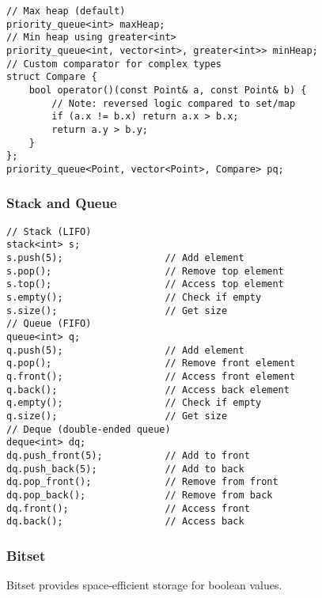 \documentclass[11pt,a4paper]{article}
\begin{document}
\begin{lstlisting}[caption={Basic Priority Queue}]
// Max heap (default)
priority_queue<int> maxHeap;
// Min heap using greater<int>
priority_queue<int, vector<int>, greater<int>> minHeap;
// Custom comparator for complex types
struct Compare {
    bool operator()(const Point& a, const Point& b) {
        // Note: reversed logic compared to set/map
        if (a.x != b.x) return a.x > b.x;
        return a.y > b.y;
    }
};
priority_queue<Point, vector<Point>, Compare> pq;
\end{lstlisting}



\subsubsection{Stack and Queue}
\begin{lstlisting}[caption={Stack and Queue Operations}]
// Stack (LIFO)
stack<int> s;
s.push(5);                  // Add element
s.pop();                    // Remove top element
s.top();                    // Access top element
s.empty();                  // Check if empty
s.size();                   // Get size
// Queue (FIFO)
queue<int> q;
q.push(5);                  // Add element
q.pop();                    // Remove front element
q.front();                  // Access front element
q.back();                   // Access back element
q.empty();                  // Check if empty
q.size();                   // Get size
// Deque (double-ended queue)
deque<int> dq;
dq.push_front(5);           // Add to front
dq.push_back(5);            // Add to back
dq.pop_front();             // Remove from front
dq.pop_back();              // Remove from back
dq.front();                 // Access front
dq.back();                  // Access back
\end{lstlisting}

\newpage

\subsubsection{Bitset}
Bitset provides space-efficient storage for boolean values.
\end{document}
